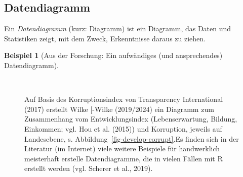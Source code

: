 \documentclass[
  a4paper,
]{scrbook}
\theoremstyle{definition}
\newtheorem{example}{Beispiel}[chapter]
\theoremstyle{definition}
\theoremstyle{definition}
\theoremstyle{remark}
\begin{document}
\subsection{Datendiagramm}\label{datendiagramm}

Ein \emph{Datendiagramm} (kurz: Diagramm) ist ein Diagramm, das Daten
und Statistiken zeigt, mit dem Zweck, Erkenntnisse daraus zu ziehen.

\begin{example}[Aus der Forschung: Ein aufwändiges (und ansprechendes)
Datendiagramm]\protect\hypertarget{exm-datendiagramm}{}\label{exm-datendiagramm}

~

\begin{figure}

\begin{minipage}{0.48\linewidth}
Auf Basis des Korruptionsindex von Transparency International (2017)
erstellt Wilke {[}-Wilke (2019/2024) ein Diagramm zum Zusammenhang vom
Entwicklungsindex (Lebenserwartung, Bildung, Einkommen; vgl. Hou et al.
(2015)) und Korruption, jeweils auf Landesebene, s.
Abbildung~\ref{fig-develop-corrupt}.Es finden sich in der Literatur (im
Internet) viele weitere Beispiele für handwerklich meisterhaft erstelle
Datendiagramme, die in vielen Fällen mit R erstellt werden (vgl. Scherer
et al., 2019).\end{minipage}%
%
\begin{minipage}{0.05\linewidth}
~\end{minipage}%
%
\begin{minipage}{0.48\linewidth}

\begin{figure}[H]

\end{figure}
\end{minipage}
\end{figure}
\end{example}
\end{document}
